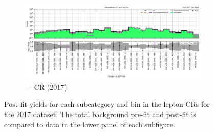 \begin{figure}[htbp]
    \begin{subfigure}[b]{0.65\textwidth}
        \includegraphics[width=\textwidth]{chapters/higgstoinv/figures/mountain_ranges/2017/ttH/Zee_tree_fit_b-abs_values_ttH_cats.pdf}
        \caption{\ttH --- \doubleEleCr \gls{CR} (2017)}
    \end{subfigure}
    \caption[Post-fit yields for each \ttH subcategory and \ptmiss bin in the lepton control regions for the 2017 dataset]{Post-fit yields for each \ttH subcategory and \ptmiss bin in the lepton \glspl{CR} for the 2017 dataset. The total background pre-fit and post-fit is compared to data in the lower panel of each subfigure.}
    \label{fig:htoinv_mountain_range_ttH_2017_CRs}
\end{figure}

